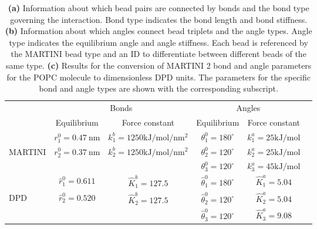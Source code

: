 \documentclass[
    11pt,
    a4paper,
    oneside,        %
    BCOR=10mm,      %
    parskip=half,   %
    listof=nototoc,   %
    bibliography=totoc %
]{scrreprt}
\begin{document}
\begin{table}[t]
    \vspace{1em}
    
    \begin{minipage}[t]{\textwidth}
        \centering
        \renewcommand{\arraystretch}{1.3}
        \setlength{\tabcolsep}{8pt}
        \begin{tabular}{lccccc}
            \toprule 
             & \multicolumn{2}{c}{Bonds} & \multicolumn{2}{c}{Angles} \\
             & Equilibrium & Force constant & Equilibrium & Force constant \\
             \midrule 
             & $r_1^0 = \SI{0.47}{\nano\m}$ & $k_1^b = 1250\si{\kilo\J\per\mol\per\nano\m\squared}$ & $\theta_1^0 = 180^\circ$ & $k_1^a = 25\si{\kilo\J\per\mol}$ \\
            MARTINI & $r_2^0 = \SI{0.37}{\nano\m}$ & $k_2^b = 1250\si{\kilo\J\per\mol\per\nano\m\squared}$ & $\theta_2^0 = 120^\circ$ & $k_2^a = 25\si{\kilo\J\per\mol}$ \\
             & & & $\theta_3^0 = 120^\circ$ & $k_3^a = 45\si{\kilo\J\per\mol}$ \\
             \midrule 
             & $\hat{r}_1^0 = 0.611$ & $\hat{K}_1^b = 127.5$ & $\hat{\theta}_1^0 = 180^\circ$ & $\hat{K}_1^a = 5.04$ \\
            DPD & $\hat{r}_2^0 = 0.520$ & $\hat{K}_2^b = 127.5$ & $\hat{\theta}_2^0 = 120^\circ$ & $\hat{K}_2^a = 5.04$ \\
             & & & $\hat{\theta}_3^0 = 120^\circ$ & $\hat{K}_3^a = 9.08$ \\
             \bottomrule
        \end{tabular}
        \subcaption{}
        \label{tab:bond_angle_params}
    \end{minipage}
    
    \caption{\textbf{(a)} Information about which bead pairs are connected by bonds and the bond type governing the interaction. Bond type indicates the bond length and bond stiffness. \textbf{(b)} Information about which angles connect bead triplets and the angle types. Angle type indicates the equilibrium angle and angle stiffness. Each bead is referenced by the MARTINI bead type and an ID to differentiate between different beads of the same type. \textbf{(c)} Results for the conversion of MARTINI 2 bond and angle parameters for the POPC molecule 
    to dimensionless DPD units. The parameters for the specific bond and angle types are shown with the corresponding subscript.}
    \label{tab:bond_angle_connections}
\end{table}
\end{document}

